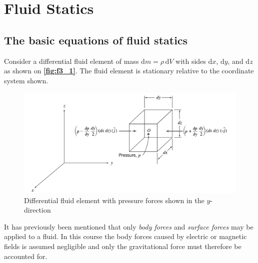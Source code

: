 
\section{Fluid Statics}

\subsection{The basic equations of fluid statics}
Consider a differential fluid element of mass $\mathrm{d}m = \rho \, \mathrm{d}V$ with sides $\mathrm{d}x $, $\mathrm{d}y$, and $\mathrm{d}z$ as shown on \textbf{\autoref{fig:f3_1}}. The fluid element is stationary relative to the coordinate system shown.

\begin{figure} [htpb]
  \centering
  \includegraphics[width=0.5\linewidth]{./figures/f3_1.png}
  \caption{Differential fluid element with pressure forces shown in the $y$-direction}
  \label{fig:f3_1}
\end{figure}

It has previously been mentioned that only \textit{body forces} and \textit{surface forces} may be applied to a fluid. In this course the body forces caused by electric or magnetic fields is assumed negligible and only the gravitational force must therefore be accounted for.

